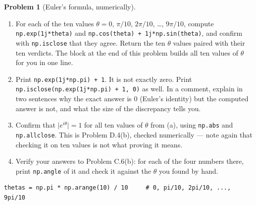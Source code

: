 \documentclass[11pt]{article}
\theoremstyle{definition}
\newtheorem{prob}{Problem}[section]
\begin{document}
\begin{prob}[Euler's formula, numerically]
\begin{enumerate}[label=\textbf{(\alph*)},leftmargin=2.6em,itemsep=7pt,topsep=6pt]
  \item For each of the ten values $\theta = 0$, $\pi/10$, $2\pi/10$, \dots,
        $9\pi/10$, compute \texttt{np.exp(1j*theta)} and
        \texttt{np.cos(theta) + 1j*np.sin(theta)}, and confirm with
        \texttt{np.isclose} that they agree. Return the ten $\theta$ values
        paired with their ten verdicts. The block at the end of this problem
        builds all ten values of $\theta$ for you in one line.
  \item Print \texttt{np.exp(1j*np.pi) + 1}. It is not exactly zero. Print
        \texttt{np.isclose(np.exp(1j*np.pi) + 1, 0)} as well. In a comment,
        explain in two sentences why the exact answer is $0$ (Euler's identity)
        but the computed answer is not, and what the size of the discrepancy
        tells you.
  \item Confirm that $\lvert e^{i\theta}\rvert = 1$ for all ten values of
        $\theta$ from (a), using \texttt{np.abs} and \texttt{np.allclose}. This
        is Problem D.4(b), checked numerically --- note again that checking it on
        ten values is not what proving it means.
  \item Verify your answers to Problem C.6(b): for each of the four numbers
        there, print \texttt{np.angle} of it and check it against the $\theta$
        you found by hand.
\end{enumerate}

\begin{lstlisting}
thetas = np.pi * np.arange(10) / 10     # 0, pi/10, 2pi/10, ..., 9pi/10
\end{lstlisting}
\end{prob}
\end{document}
